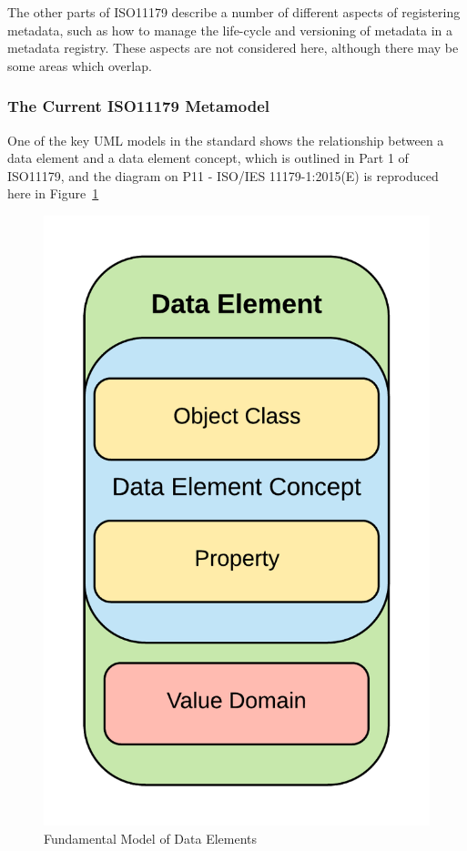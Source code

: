 \documentclass{article}
\begin{document}
The other parts of ISO11179 describe a number of different aspects of registering metadata, such as how to manage the life-cycle and versioning of metadata in a metadata registry. These aspects are not considered here, although there may be some areas which overlap.

\subsubsection{The Current ISO11179 Metamodel}

One of the key UML models in the standard shows the relationship between a data element and a data element concept, which is outlined in Part 1 of ISO11179, and the diagram on P11 - ISO/IES 11179-1:2015(E) is reproduced here in Figure~\ref{fig:dataelement}

\begin{figure}[h]
	\includegraphics[scale=0.62]{Figs/DataElement1}
	\caption{Fundamental Model of Data Elements}
	\label{fig:dataelement}
\end{figure}
\end{document}
